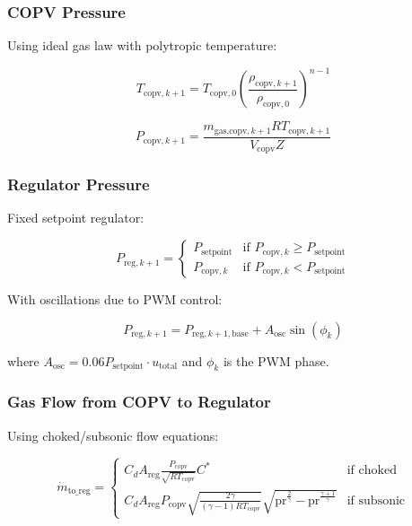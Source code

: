 \documentclass[11pt,a4paper]{article}
\begin{document}
\subsubsection{COPV Pressure}

Using ideal gas law with polytropic temperature:

\begin{equation}
T_{\text{copv},k+1} = T_{\text{copv},0} \left(\frac{\rho_{\text{copv},k+1}}{\rho_{\text{copv},0}}\right)^{n-1}
\end{equation}

\begin{equation}
P_{\text{copv},k+1} = \frac{m_{\text{gas,copv},k+1} R T_{\text{copv},k+1}}{V_{\text{copv}} Z}
\end{equation}

\subsubsection{Regulator Pressure}

Fixed setpoint regulator:

\begin{equation}
P_{\text{reg},k+1} = \begin{cases}
P_{\text{setpoint}} & \text{if } P_{\text{copv},k} \geq P_{\text{setpoint}} \\
P_{\text{copv},k} & \text{if } P_{\text{copv},k} < P_{\text{setpoint}}
\end{cases}
\end{equation}

With oscillations due to PWM control:

\begin{equation}
P_{\text{reg},k+1} = P_{\text{reg},k+1,\text{base}} + A_{\text{osc}} \sin(\phi_k)
\end{equation}

where $A_{\text{osc}} = 0.06 P_{\text{setpoint}} \cdot u_{\text{total}}$ and $\phi_k$ is the PWM phase.

\subsubsection{Gas Flow from COPV to Regulator}

Using choked/subsonic flow equations:

\begin{equation}
\dot{m}_{\text{to\_reg}} = \begin{cases}
C_d A_{\text{reg}} \frac{P_{\text{copv}}}{\sqrt{R T_{\text{copv}}}} C^* & \text{if choked} \\
C_d A_{\text{reg}} P_{\text{copv}} \sqrt{\frac{2\gamma}{(\gamma-1)RT_{\text{copv}}}} \sqrt{\text{pr}^{\frac{2}{\gamma}} - \text{pr}^{\frac{\gamma+1}{\gamma}}} & \text{if subsonic}
\end{cases}
\end{equation}
\end{document}
